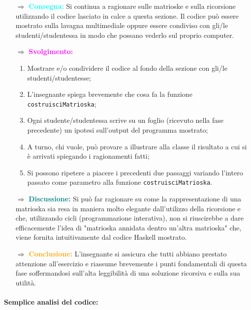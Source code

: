 \begin{itemize}
    \item [$\Rightarrow$] \textbf{\textcolor{cyan}{Consegna:}} Si continua a ragionare sulle matrioske
    e sulla ricorsione utilizzando il codice lasciato in calce a questa sezione. Il codice può
    essere mostrato sulla lavagna multimediale oppure essere condiviso con gli/le studenti/studentessa in
    modo che possano vederlo sul proprio computer.
    \item [$\Rightarrow$] \textbf{\textcolor{magenta}{Svolgimento:}}
    \begin{enumerate}
        \item Mostrare e/o condividere il codice al fondo della sezione con gli/le studenti/studentesse;
        \item L'insegnante spiega brevemente che cosa fa la funzione \texttt{costruisciMatrioska};
        \item Ogni studente/studentessa scrive su un foglio (ricevuto nella fase precedente) un ipotesi
        sull'output del programma mostrato;
        \item A turno, chi vuole, può provare a illustrare alla classe il risultato a cui si è arrivati spiegando i ragionamenti fatti;
        \item Si possono ripetere a piacere i precedenti due passaggi variando l'intero passato come parametro
        alla funzione \texttt{costruisciMatrioska}.
    \end{enumerate}
    \item [$\Rightarrow$] \textbf{\textcolor{teal}{Discussione:}} Si può far ragionare su come la rappresentazione
    di una matrioska sia resa in maniera molto elegante dall'utilizzo della ricorsione e che, utilizzando cicli (programmazione interativa),
    non si riuscirebbe a dare efficacemente l'idea di "matrioska annidata dentro un'altra matrioska" che,
    viene fornita intuitivamente dal codice Haskell mostrato. 
    \item [$\Rightarrow$] \textbf{\textcolor{orange}{Conclusione:}} L'insegnante si assicura
    che tutti abbiano prestato attenzione all'esercizio e riassume brevemente i punti fondamentali
    di questa fase soffermandosi sull'alta leggibilità di una soluzione ricorsiva e sulla sua utilità.
\end{itemize}

\paragraph{Semplice analisi del codice:}

